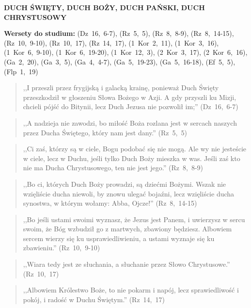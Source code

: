 \documentclass[10pt,a4paper,oneside]{article}
\begin{document}
\centerline{\textbf{\MakeUppercase{Duch Święty, Duch Boży, Duch Pański, Duch Chrystusowy}}}
\begin{center}
\textbf{Wersety do studium:} \mbox{(Dz 16, 6-7)}, \mbox{(Rz 5, 5)}, \mbox{(Rz 8, 8-9)}, \mbox{(Rz 8, 14-15)}, \mbox{(Rz 10, 9-10)}, \mbox{(Rz 10, 17)}, \mbox{(Rz 14, 17)}, \mbox{(1 Kor 2, 11)}, \mbox{(1 Kor 3, 16)}, \mbox{(1 Kor 6, 9-10)}, \mbox{(1 Kor 6, 19-20)}, \mbox{(1 Kor 12, 3)}, \mbox{(2 Kor 3, 17)}, \mbox{(2 Kor 6, 16)}, \mbox{(Ga 2, 20)}, \mbox{(Ga 3, 5)}, \mbox{(Ga 4, 4-7)}, \mbox{(Ga 5, 19-23)}, \mbox{(Ga 5, 16-18)}, \mbox{(Ef 5, 5)}, \mbox{(Flp 1, 19)}
\end{center}
\begin{quote}
,,I przeszli przez frygijską i galacką krainę, ponieważ Duch Święty przeszkodził w głoszeniu Słowa Bożego w Azji. A gdy przyszli ku Mizji, chcieli pójść do Bitynii, lecz Duch Jezusa nie pozwolił im;'' \mbox{(Dz 16, 6-7)}
\end{quote}
\begin{quote}
,,A nadzieja nie zawodzi, bo miłość Boża rozlana jest w sercach naszych przez Ducha Świętego, który nam jest dany.'' \mbox{(Rz 5, 5)}
\end{quote}
\begin{quote}
,,Ci zaś, którzy są w ciele, Bogu podobać się nie mogą. Ale wy nie jesteście w ciele, lecz w Duchu, jeśli tylko Duch Boży mieszka w was. Jeśli zaś kto nie ma Ducha Chrystusowego, ten nie jest jego.'' \mbox{(Rz 8, 8-9)}
\end{quote}
\begin{quote}
,,Bo ci, których Duch Boży prowadzi, są dziećmi Bożymi. Wszak nie wzięliście ducha niewoli, by znowu ulegać bojaźni, lecz wzięliście ducha synostwa, w którym wołamy: Abba, Ojcze!'' \mbox{(Rz 8, 14-15)}
\end{quote}
\begin{quote}
,,Bo jeśli ustami swoimi wyznasz, że Jezus jest Panem, i uwierzysz w sercu swoim, że Bóg wzbudził go z martwych, zbawiony będziesz. Albowiem sercem wierzy się ku usprawiedliwieniu, a ustami wyznaje się ku zbawieniu.'' \mbox{(Rz 10, 9-10)}
\end{quote}
\begin{quote}
,,Wiara tedy jest ze słuchania, a słuchanie przez Słowo Chrystusowe.'' \mbox{(Rz 10, 17)}
\end{quote}
\begin{quote}
,,Albowiem Królestwo Boże, to nie pokarm i napój, lecz sprawiedliwość i pokój, i radość w Duchu Świętym.'' \mbox{(Rz 14, 17)}
\end{quote}
\end{document}
